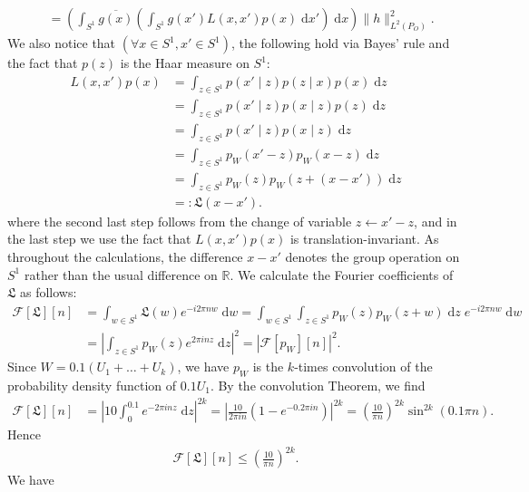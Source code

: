\documentclass[11pt]{article}
\newcommand{\calF}{\mathcal{F}}
\newcommand{\0}{\mathbf{0}}
\begin{document}
\begin{appendix}
\begin{align}
    &=  \left(\int_{S^1}\overline{g(x)}\left(\int_{S^1}g(x')L(x,x')p(x)\;\mathrm{d}x'\right)\;\mathrm{d}x\right)\|h\|^2_{L^2(P_{O})}\label{eq:schwartz_tf_intm}.
\end{align}
We also notice that $(\forall x\in S^1, x'\in S^1)$, the following hold via Bayes' rule and the fact that $p(z)$ is the Haar measure on $S^1$:
\begin{align*}
    L(x,x')p(x) &= \int_{z\in S^1}p(x'\mid z)p(z\mid x)p(x)\;\mathrm{d}z\\
    &= \int_{z\in S^1} p(x'\mid z)p(x\mid z)p(z)\;\mathrm{d}z\\
    &= \int_{z\in S^1}p(x'\mid z)p(x\mid z)\;\mathrm{d}z\\
    &= \int_{z\in S^1}p_W(x'-z)p_{W}(x-z)\;\mathrm{d}z\\
    &= \int_{z\in S^1}p_{W}(z)p_W(z + (x-x'))\;\mathrm{d}z\\
    &=: \mathfrak{L}(x-x').
\end{align*}
where the second last step follows from the change of variable $z\leftarrow x'-z$, and in the last step we use the fact that $L(x,x')p(x)$ is translation-invariant. As throughout the calculations, the difference $x-x'$ denotes the group operation on $S^{1}$ rather than the usual difference on $\mathbb{R}$. We calculate the Fourier coefficients of $\mathfrak{L}$ as follows:
\begin{align*}
    \calF[\mathfrak{L}][n] &= \int_{w\in S^1}\mathfrak{L}(w)e^{-i2\pi nw}\;\mathrm{d}w = \int_{w\in S^1}\int_{z\in S^1}p_{W}(z)p_W(z + w)\;\mathrm{d}z\;e^{-i2\pi nw}\;\mathrm{d}w\\
    &=\left|\int_{z\in S^1}p_{W}(z)e^{2\pi in z}\;\mathrm{d}z\right|^2 = |\calF[p_{W}][n]|^2.
\end{align*}
Since $W = 0.1(U_1 + \dots + U_k)$, we have $p_{W}$ is the $k$-times convolution of the probability density function of $0.1U_1$. By the convolution Theorem, we find
\begin{align}
\label{eq: schwartz_fourier_nonabs_val}
    \calF[\mathfrak{L}][n] &= \left|10\int_{0}^{0.1}e^{-2\pi i nz}\;\mathrm{d}z\right|^{2k} = \left|\frac{10}{2\pi i n}\left(1 - e^{-0.2\pi i n}\right)\right|^{2k}  = \left(\frac{10}{\pi n}\right)^{2k}\sin^{2k}(0.1\pi n).
\end{align}
Hence
\begin{align}
\label{eq:schwartz_fcoeff_mf_L}
    \calF[\mathfrak{L}][n]\leq \left(\frac{10}{\pi n}\right)^{2k}.
\end{align}
We have
\begin{align}

\end{align}
\end{appendix}
\end{document}
